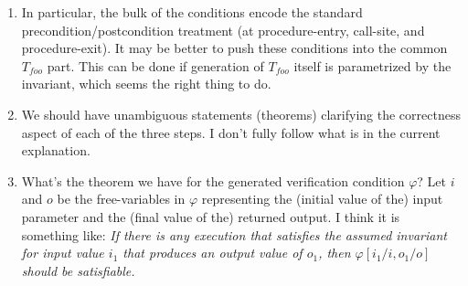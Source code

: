 \begin{enumerate}
\begin{enumerate}
\item In particular, the bulk of the conditions encode the standard
precondition/postcondition treatment (at procedure-entry, call-site,
and procedure-exit). It may be better to push these conditions into
the common $T_{foo}$ part. This can be done if generation of $T_{foo}$
itself is parametrized by the invariant, which seems the right thing to do.

\item We should have unambiguous statements (theorems) clarifying the
correctness aspect of each of the three steps. I don't fully follow what is
in the current explanation.

\item What's the theorem we have for the generated verification
condition $\varphi$? Let $i$ and $o$ be the free-variables in $\varphi$
representing the (initial value of the) input parameter and the
(final value of the) returned output. I think it is something like:
\emph{
If there is any execution that
satisfies the assumed invariant for input value $i_1$ that produces
an output value of $o_1$, then $\varphi[i_1/i,o_1/o]$ should be
satisfiable.
}


\end{enumerate}

\end{enumerate}